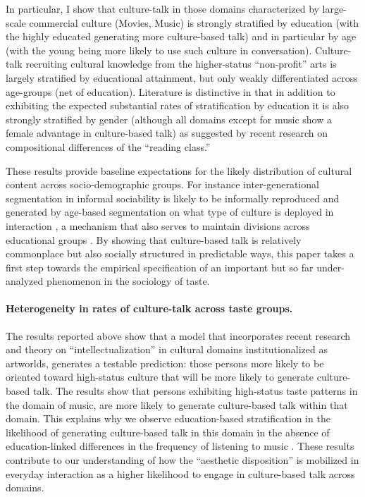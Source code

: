 \documentclass[11pt]{article}
\begin{document}
In particular, I show that culture-talk in those domains characterized by large-scale commercial culture (Movies, Music) is strongly stratified by education (with the highly educated generating more culture-based talk) and in particular by age (with the young being more likely to use such culture in conversation). Culture-talk recruiting cultural knowledge from the higher-status ``non-profit'' arts is largely stratified by educational attainment, but only weakly differentiated across age-groups (net of education).  Literature is distinctive in that in addition to exhibiting the expected substantial rates of stratification by education it is also strongly stratified by gender (although all domains except for music show a female advantage in culture-based talk) as suggested by recent research on compositional differences of the ``reading class.''  

These results provide baseline expectations for the likely distribution of cultural content across socio-demographic groups.  For instance inter-generational segmentation in informal sociability is likely to be informally reproduced and generated by age-based segmentation on what type of culture is deployed in interaction \citep{milner04}, a mechanism that also serves to maintain divisions across educational groups \citep{collins75}.   By showing that culture-based talk is relatively commonplace but also socially structured in predictable ways, this paper takes a first step towards the empirical specification of an important but so far under-analyzed phenomenon in the sociology of taste.  

\paragraph{Heterogeneity in rates of culture-talk across taste groups.}
The results reported above show that a model that incorporates recent research and theory on ``intellectualization'' in cultural domains institutionalized as artworlds, generates a testable prediction: those persons more likely to be oriented toward high-status culture that will be more likely to generate culture-based talk. The results show that persons exhibiting high-status taste patterns in the domain of music, are more likely to generate culture-based talk within that domain.  This explains why we observe education-based stratification in the likelihood of generating culture-based talk in this domain in the absence of education-linked differences in the frequency of listening to music \citep{denora00}. These results contribute to our understanding of how the ``aesthetic disposition'' is mobilized in everyday interaction as a higher likelihood to engage in culture-based talk across domains. 
\end{document}
